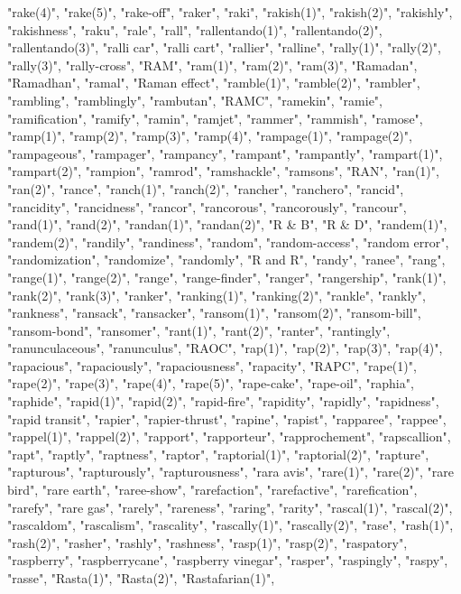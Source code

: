 "rake(4)",
"rake(5)",
"rake-off",
"raker",
"raki",
"rakish(1)",
"rakish(2)",
"rakishly",
"rakishness",
"raku",
"rale",
"rall",
"rallentando(1)",
"rallentando(2)",
"rallentando(3)",
"ralli car",
"ralli cart",
"rallier",
"ralline",
"rally(1)",
"rally(2)",
"rally(3)",
"rally-cross",
"RAM",
"ram(1)",
"ram(2)",
"ram(3)",
"Ramadan",
"Ramadhan",
"ramal",
"Raman effect",
"ramble(1)",
"ramble(2)",
"rambler",
"rambling",
"ramblingly",
"rambutan",
"RAMC",
"ramekin",
"ramie",
"ramification",
"ramify",
"ramin",
"ramjet",
"rammer",
"rammish",
"ramose",
"ramp(1)",
"ramp(2)",
"ramp(3)",
"ramp(4)",
"rampage(1)",
"rampage(2)",
"rampageous",
"rampager",
"rampancy",
"rampant",
"rampantly",
"rampart(1)",
"rampart(2)",
"rampion",
"ramrod",
"ramshackle",
"ramsons",
"RAN",
"ran(1)",
"ran(2)",
"rance",
"ranch(1)",
"ranch(2)",
"rancher",
"ranchero",
"rancid",
"rancidity",
"rancidness",
"rancor",
"rancorous",
"rancorously",
"rancour",
"rand(1)",
"rand(2)",
"randan(1)",
"randan(2)",
"R \& B",
"R \& D",
"randem(1)",
"randem(2)",
"randily",
"randiness",
"random",
"random-access",
"random error",
"randomization",
"randomize",
"randomly",
"R and R",
"randy",
"ranee",
"rang",
"range(1)",
"range(2)",
"range",
"range-finder",
"ranger",
"rangership",
"rank(1)",
"rank(2)",
"rank(3)",
"ranker",
"ranking(1)",
"ranking(2)",
"rankle",
"rankly",
"rankness",
"ransack",
"ransacker",
"ransom(1)",
"ransom(2)",
"ransom-bill",
"ransom-bond",
"ransomer",
"rant(1)",
"rant(2)",
"ranter",
"rantingly",
"ranunculaceous",
"ranunculus",
"RAOC",
"rap(1)",
"rap(2)",
"rap(3)",
"rap(4)",
"rapacious",
"rapaciously",
"rapaciousness",
"rapacity",
"RAPC",
"rape(1)",
"rape(2)",
"rape(3)",
"rape(4)",
"rape(5)",
"rape-cake",
"rape-oil",
"raphia",
"raphide",
"rapid(1)",
"rapid(2)",
"rapid-fire",
"rapidity",
"rapidly",
"rapidness",
"rapid transit",
"rapier",
"rapier-thrust",
"rapine",
"rapist",
"rapparee",
"rappee",
"rappel(1)",
"rappel(2)",
"rapport",
"rapporteur",
"rapprochement",
"rapscallion",
"rapt",
"raptly",
"raptness",
"raptor",
"raptorial(1)",
"raptorial(2)",
"rapture",
"rapturous",
"rapturously",
"rapturousness",
"rara avis",
"rare(1)",
"rare(2)",
"rare bird",
"rare earth",
"raree-show",
"rarefaction",
"rarefactive",
"rarefication",
"rarefy",
"rare gas",
"rarely",
"rareness",
"raring",
"rarity",
"rascal(1)",
"rascal(2)",
"rascaldom",
"rascalism",
"rascality",
"rascally(1)",
"rascally(2)",
"rase",
"rash(1)",
"rash(2)",
"rasher",
"rashly",
"rashness",
"rasp(1)",
"rasp(2)",
"raspatory",
"raspberry",
"raspberrycane",
"raspberry vinegar",
"rasper",
"raspingly",
"raspy",
"rasse",
"Rasta(1)",
"Rasta(2)",
"Rastafarian(1)",
